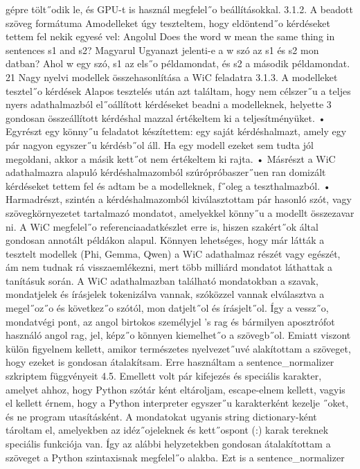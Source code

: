 \documentclass[12pt]{report}
\theoremstyle{definition}
\begin{document}
 gépre tölt˝odik le, és GPU-t is használ megfelel˝o beállításokkal.
 3.1.2. A beadott szöveg formátuma
 Amodelleket úgy teszteltem, hogy eldöntend˝o kérdéseket tettem fel nekik egyesé
vel:
 Angolul
 Does the word w mean the same thing in
 sentences s1 and s2?
 Magyarul
 Ugyanazt jelenti-e a w szó az s1 és s2 mon
datban?
 Ahol w egy szó, s1 az els˝o példamondat, és s2 a második példamondat.
 21
Nagy nyelvi modellek összehasonlítása a WiC feladatra
 3.1.3. A modelleket tesztel˝o kérdések
 Alapos tesztelés után azt találtam, hogy nem célszer˝u a teljes nyers adathalmazból
 el˝oállított kérdéseket beadni a modelleknek, helyette 3 gondosan összeállított kérdéshal
mazzal értékeltem ki a teljesítményüket.
 • Egyrészt egy könny˝u feladatot készítettem: egy saját kérdéshalmazt, amely egy pár
 nagyon egyszer˝u kérdésb˝ol áll. Ha egy modell ezeket sem tudta jól megoldani,
 akkor a másik kett˝ot nem értékeltem ki rajta.
 • Másrészt a WiC adathalmazra alapuló kérdéshalmazomból szúrópróbaszer˝uen ran
domizált kérdéseket tettem fel és adtam be a modelleknek, f˝oleg a teszthalmazból.
 • Harmadrészt, szintén a kérdéshalmazomból kiválasztottam pár hasonló szót, vagy
 szövegkörnyezetet tartalmazó mondatot, amelyekkel könny˝u a modellt összezavar
ni.
 A WiC megfelel˝o referenciaadatkészlet erre is, hiszen szakért˝ok által gondosan annotált
 példákon alapul. Könnyen lehetséges, hogy már látták a tesztelt modellek (Phi, Gemma,
 Qwen) a WiC adathalmaz részét vagy egészét, ám nem tudnak rá visszaemlékezni, mert
 több milliárd mondatot láthattak a tanításuk során.
 A WiC adathalmazban található mondatokban a szavak, mondatjelek és írásjelek
 tokenizálva vannak, szóközzel vannak elválasztva a megel˝oz˝o és következ˝o szótól, mon
datjelt˝ol és írásjelt˝ol. Így a vessz˝o, mondatvégi pont, az angol birtokos személyjel 's rag
 és bármilyen aposztrófot használó angol rag, jel, képz˝o könnyen kiemelhet˝o a szövegb˝ol.
 Emiatt viszont külön figyelnem kellett, amikor természetes nyelvezet˝uvé alakítottam a
 szöveget, hogy ezeket is gondosan átalakítsam.
 Erre használtam a sentence_normalizer szkriptem függvényeit 4.5.
 Emellett volt pár kifejezés és speciális karakter, amelyet ahhoz, hogy Python szótár
ként eltároljam, escape-elnem kellett, vagyis el kellett érnem, hogy a Python interpreter
 egyszer˝u karakterként kezelje ˝oket, és ne program utasításként. A mondatokat ugyanis
 string dictionary-ként tároltam el, amelyekben az idéz˝ojeleknek és kett˝ospont (:) karak
tereknek speciális funkciója van. Így az alábbi helyzetekben gondosan átalakítottam a
 szöveget a Python szintaxisnak megfelel˝o alakba. Ezt is a sentence_normalizer
\end{document}
